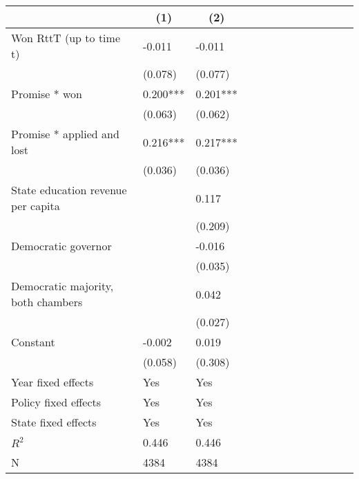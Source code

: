 {
\def\sym#1{\ifmmode^{#1}\else\(^{#1}\)\fi}
\begin{tabular}{l*{2}{C{1.6cm}C{1.6cm}C{1.6cm}C{1.6cm}C{1.6cm}C{1.6cm}}}
\toprule
                    &   &   \\
\midrule
Won RttT (up to time t)&      -0.011   &      -0.011   \\
                    &     (0.078)   &     (0.077)   \\
Promise * won       &       0.200***&       0.201***\\
                    &     (0.063)   &     (0.062)   \\
Promise * applied and lost&       0.216***&       0.217***\\
                    &     (0.036)   &     (0.036)   \\
State education revenue per capita&               &       0.117   \\
                    &               &     (0.209)   \\
Democratic governor &               &      -0.016   \\
                    &               &     (0.035)   \\
Democratic majority, both chambers&               &       0.042   \\
                    &               &     (0.027)   \\
Constant            &      -0.002   &       0.019   \\
                    &     (0.058)   &     (0.308)   \\
Year fixed effects  &         Yes   &         Yes   \\
Policy fixed effects &         Yes   &         Yes   \\
State fixed effects &         Yes   &         Yes   \\
\midrule
$ R ^ {2} $         &       0.446   &       0.446   \\
N                   &        4384   &        4384   \\
\bottomrule
\end{tabular}
}
